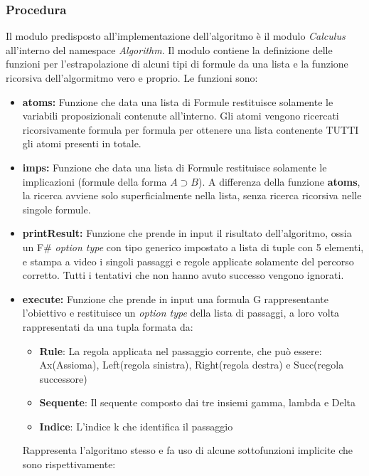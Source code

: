 \documentclass[\main/tesi.tex]{subfiles}
\begin{document}
\subsubsection{Procedura}
Il modulo predisposto all'implementazione dell'algoritmo è il modulo \textit{Calculus} all'interno del namespace \textit{Algorithm}. Il modulo contiene la definizione delle funzioni per l'estrapolazione di alcuni tipi di formule da una lista e la funzione ricorsiva dell'algormitmo vero e proprio. Le funzioni sono:
\begin{itemize}
    \item \textbf{atoms:} Funzione che data una lista di Formule restituisce solamente le variabili proposizionali contenute all'interno. Gli atomi vengono ricercati ricorsivamente formula per formula per ottenere una lista contenente TUTTI gli atomi presenti in totale.
    \item \textbf{imps:} Funzione che data una lista di Formule restituisce solamente le implicazioni (formule della forma $A \supset B$). A differenza della funzione \textbf{atoms}, la ricerca avviene solo superficialmente nella lista, senza ricerca ricorsiva nelle singole formule.
    \item \textbf{printResult:} Funzione che prende in input il risultato dell'algoritmo, ossia un F\# \cite{fsharp} \textit{option type} con tipo generico impostato a lista di tuple con 5 elementi, e stampa a video i singoli passaggi e regole applicate solamente del percorso corretto. Tutti i tentativi che non hanno avuto successo vengono ignorati.
    \item \textbf{execute:} Funzione che prende in input una formula G rappresentante l'obiettivo e restituisce un \textit{option type} della lista di passaggi, a loro volta rappresentati da una tupla formata da:
          \begin{itemize}
              \item \textbf{Rule}: La regola applicata nel passaggio corrente, che può essere: Ax(Assioma), Left(regola sinistra), Right(regola destra) e Succ(regola successore)
              \item \textbf{Sequente}: Il sequente composto dai tre insiemi gamma, lambda e Delta
              \item \textbf{Indice}: L'indice k che identifica il passaggio
          \end{itemize}
          Rappresenta l'algoritmo stesso e fa uso di alcune sottofunzioni implicite che sono rispettivamente:
          \begin{itemize}

\end{itemize}
\end{itemize}
\end{document}
